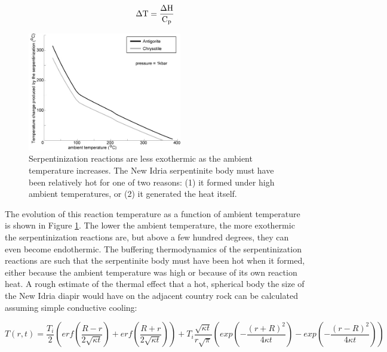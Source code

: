 \documentclass[11pt,twoside]{article}
\begin{document}
$$\rm \Delta T = \frac{\Delta H}{C_p}$$

\begin{figure}[here]
  \includegraphics[width=0.6\textwidth]{serpentinization.jpg}
  \caption{
  Serpentinization  reactions  are  less  exothermic  as  the  ambient
  temperature increases.   The New  Idria serpentinite body  must have
  been relatively hot for one of two reasons: (1) it formed under high
  ambient temperatures, or (2) it generated the heat itself.}
\label{fig:serpentinization}
\end{figure}

The evolution  of this reaction  temperature as a function  of ambient
temperature is shown  in Figure \ref{fig:serpentinization}.  The lower
the  ambient  temperature, the  more  exothermic the  serpentinization
reactions are, but  above a few hundred degrees,  they can even become
endothermic.   The buffering  thermodynamics  of the  serpentinization
reactions are such that the  serpentinite body must have been hot when
it formed, either because the  ambient temperature was high or because
of its own reaction heat.  A rough estimate of the thermal effect that
a hot, spherical  body the size of the New Idria  diapir would have on
the adjacent country rock can be calculated assuming simple conductive
cooling:

$$ T(r,t) = \frac{T_i}{2} \left(erf\left
            (\frac{R-r}{2 \sqrt{\kappa t}}\right)
            + erf\left(\frac{R+r}{2 \sqrt{\kappa t}}\right)\right) 
         + T_i \frac{\sqrt{\kappa t}}{r \sqrt{\pi}} 
          \left(exp\left(-\frac{(r+R)^2}{4 \kappa t}\right)
              - exp\left(-\frac{(r-R)^2}{4 \kappa t}\right)\right)$$
\end{document}
